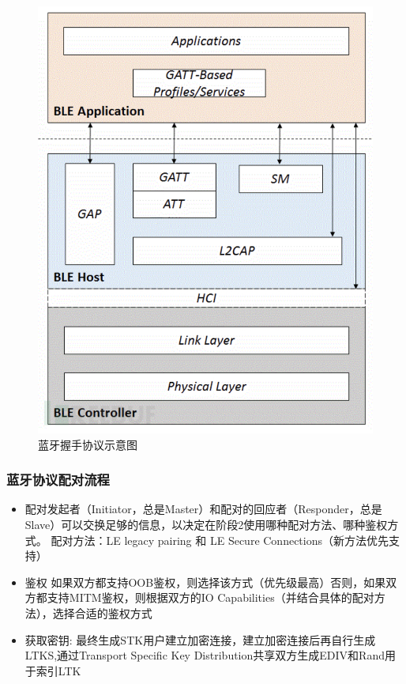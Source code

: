 \begin{figure}
    \centering
    \includegraphics[scale=0.5]{resources/img/i15.png}
    \caption{蓝牙握手协议示意图}
  \end{figure}

\subsubsection{蓝牙协议配对流程}
\begin{itemize}
    \item 配对发起者（Initiator，总是Master）和配对的回应者（Responder，总是Slave）可以交换足够的信息，以决定在阶段2使用哪种配对方法、哪种鉴权方式。
    配对方法：LE legacy pairing 和 LE Secure Connections（新方法优先支持）
    \item 鉴权 如果双方都支持OOB鉴权，则选择该方式（优先级最高）否则，如果双方都支持MITM鉴权，则根据双方的IO Capabilities（并结合具体的配对方法），选择合适的鉴权方式
    \item 获取密钥: 最终生成STK用户建立加密连接，建立加密连接后再自行生成LTKS,通过Transport Specific Key Distribution共享双方生成EDIV和Rand用于索引LTK
\end{itemize}

